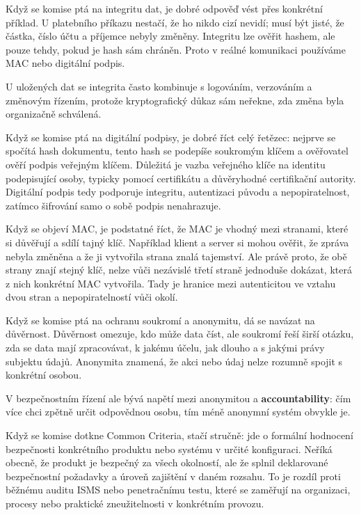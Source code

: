 \documentclass[11pt,a4paper]{article}
\begin{document}
Když se komise ptá na integritu dat, je dobré odpověď vést přes konkrétní příklad. U platebního příkazu nestačí, že ho nikdo cizí nevidí; musí být jisté, že částka, číslo účtu a příjemce nebyly změněny. Integritu lze ověřit hashem, ale pouze tehdy, pokud je hash sám chráněn. Proto v reálné komunikaci používáme MAC nebo digitální podpis.

U uložených dat se integrita často kombinuje s logováním, verzováním a změnovým řízením, protože kryptografický důkaz sám neřekne, zda změna byla organizačně schválená.

Když se komise ptá na digitální podpisy, je dobré říct celý řetězec: nejprve se spočítá hash dokumentu, tento hash se podepíše soukromým klíčem a ověřovatel ověří podpis veřejným klíčem. Důležitá je vazba veřejného klíče na identitu podepisující osoby, typicky pomocí certifikátu a důvěryhodné certifikační autority. Digitální podpis tedy podporuje integritu, autentizaci původu a nepopiratelnost, zatímco šifrování samo o sobě podpis nenahrazuje.

Když se objeví MAC, je podstatné říct, že MAC je vhodný mezi stranami, které si důvěřují a sdílí tajný klíč. Například klient a server si mohou ověřit, že zpráva nebyla změněna a že ji vytvořila strana znalá tajemství. Ale právě proto, že obě strany znají stejný klíč, nelze vůči nezávislé třetí straně jednoduše dokázat, která z nich konkrétní MAC vytvořila. Tady je hranice mezi autenticitou ve vztahu dvou stran a nepopiratelností vůči okolí.

Když se komise ptá na ochranu soukromí a anonymitu, dá se navázat na důvěrnost. Důvěrnost omezuje, kdo může data číst, ale soukromí řeší širší otázku, zda se data mají zpracovávat, k jakému účelu, jak dlouho a s jakými právy subjektu údajů. Anonymita znamená, že akci nebo údaj nelze rozumně spojit s konkrétní osobou.

V bezpečnostním řízení ale bývá napětí mezi anonymitou a \textbf{accountability}: čím více chci zpětně určit odpovědnou osobu, tím méně anonymní systém obvykle je.

Když se komise dotkne Common Criteria, stačí stručně: jde o formální hodnocení bezpečnosti konkrétního produktu nebo systému v určité konfiguraci. Neříká obecně, že produkt je bezpečný za všech okolností, ale že splnil deklarované bezpečnostní požadavky a úroveň zajištění v daném rozsahu. To je rozdíl proti běžnému auditu ISMS nebo penetračnímu testu, které se zaměřují na organizaci, procesy nebo praktické zneužitelnosti v konkrétním provozu.
\end{document}

